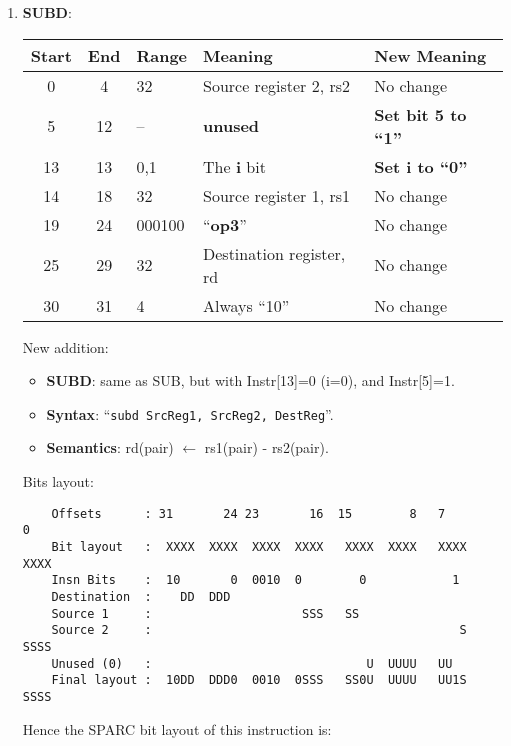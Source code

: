 \begin{enumerate}
\item \textbf{SUBD}:\\
  \begin{center}
    \begin{tabular}[p]{|c|c|l|l|l|}
      \hline
      \textbf{Start} & \textbf{End} & \textbf{Range} & \textbf{Meaning} &
                                                                          \textbf{New Meaning}\\
      \hline
      0 & 4 & 32 & Source register 2, rs2 & No change \\
      5 & 12 & -- & \textbf{unused} & \textbf{Set bit 5 to ``1''} \\
      13 & 13 & 0,1 & The \textbf{i} bit & \textbf{Set i to ``0''} \\
      14 & 18 & 32 & Source register 1, rs1 & No change \\
      19 & 24 & 000100 & ``\textbf{op3}'' & No change \\
      25 & 29 & 32 & Destination register, rd & No change \\
      30 & 31 & 4 & Always ``10'' & No change \\
      \hline
    \end{tabular}
  \end{center}
  New addition:
  \begin{itemize}
  \item []\textbf{SUBD}: same as SUB, but with Instr[13]=0 (i=0), and
    Instr[5]=1.
  \item []\textbf{Syntax}: ``\texttt{subd  SrcReg1, SrcReg2, DestReg}''.
  \item []\textbf{Semantics}: rd(pair) $\leftarrow$ rs1(pair) - rs2(pair).
  \end{itemize}
  Bits layout:
\begin{verbatim}
    Offsets      : 31       24 23       16  15        8   7        0
    Bit layout   :  XXXX  XXXX  XXXX  XXXX   XXXX  XXXX   XXXX  XXXX
    Insn Bits    :  10       0  0010  0        0            1       
    Destination  :    DD  DDD                                       
    Source 1     :                     SSS   SS
    Source 2     :                                           S  SSSS
    Unused (0)   :                              U  UUUU   UU        
    Final layout :  10DD  DDD0  0010  0SSS   SS0U  UUUU   UU1S  SSSS
\end{verbatim}

  Hence the SPARC bit layout of this instruction is:


\end{enumerate}
